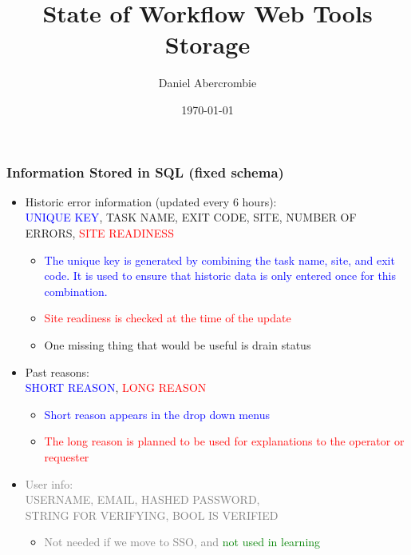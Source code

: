 \documentclass{beamer}
\author[D. Abercrombie]{
  Daniel Abercrombie
}
\title{\bf \sffamily State of Workflow Web Tools Storage}
\date{\today}
\begin{document}
\begin{frame}[nonumbering]
  \titlepage
\end{frame}

\begin{frame}
  \frametitle{Information Stored in SQL (fixed schema)}
  \begin{itemize}
  \item Historic error information (updated every 6 hours): \\
    \textcolor{blue}{UNIQUE KEY}, TASK NAME, EXIT CODE,
    SITE, NUMBER OF ERRORS, \textcolor{red}{SITE READINESS} \\
    \begin{itemize}
    \item \textcolor{blue}{
      The unique key is generated by combining the task name, site, and exit code.
      It is used to ensure that historic data is only entered once for this combination.
    }
    \item \textcolor{red}{Site readiness is checked at the time of the update}
    \item One missing thing that would be useful is drain status
    \end{itemize}
  \item Past reasons: \\
    \textcolor{blue}{SHORT REASON}, \textcolor{red}{LONG REASON}
    \begin{itemize}
    \item \textcolor{blue}{Short reason appears in the drop down menus}
    \item \textcolor{red}{
      The long reason is planned to be used for explanations to the operator or requester
    }
    \end{itemize}
  \item \textcolor{gray}{User info:} \\
    \textcolor{gray}{
      USERNAME, EMAIL, HASHED PASSWORD, \\
      STRING FOR VERIFYING, BOOL IS VERIFIED
    }
    \begin{itemize}
    \item \textcolor{gray}{Not needed if we move to SSO, and}
      \textcolor{green}{not used in learning}
    \end{itemize}
  \end{itemize}
\end{frame}
\end{document}
